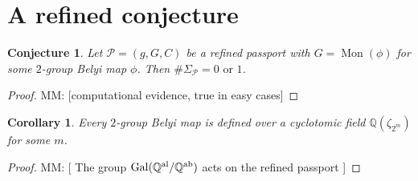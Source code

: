 \documentclass{dcthesis}
\newcommand{\QQ}{\mathbb Q}
\newcommand{\mm}[1]{{\color{blue} \sf MM: [#1]}}
\newcommand{\QQal}{{\mathbb Q}^{\textup{al}}}
\newcommand{\QQab}{{\mathbb Q}^{\textup{ab}}}
\DeclareMathOperator{\Mon}{Mon}
\DeclareMathOperator{\Gal}{Gal}
\newtheorem{conj}[prop]{Conjecture}
\newtheorem{corr}[prop]{Corollary}
\theoremstyle{definition}
\theoremstyle{remark}
\numberwithin{equation}{section}
\numberwithin{figure}{section}
\begin{document}
{  \section{A refined conjecture}{\label{sec:conjecture}}{
    \begin{conj}
      Let $\mathcal{P} = (g,G,C)$
      be a refined passport with
      $G=\Mon(\phi)$ for some $2$-group Belyi map $\phi$.
      Then $\#\Sigma_\mathcal{P} = 0\text{ or }1$.
    \end{conj}
    \begin{proof}
      \mm{computational evidence, true in easy cases}
    \end{proof}
    \begin{corr}
      Every $2$-group Belyi map is defined over a cyclotomic field
      $\QQ(\zeta_{2^m})$ for some $m$.
    \end{corr}
    \begin{proof}
      \mm{
        The group $\Gal(\QQal/\QQab)$ acts on the refined passport
      }
    \end{proof}
  }
}
\end{document}
